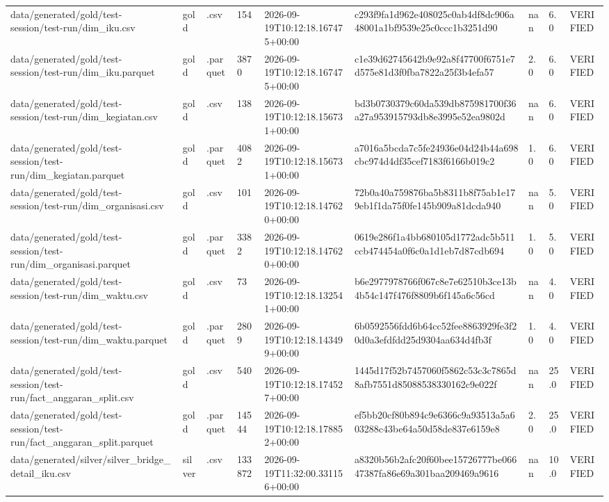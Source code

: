 \begin{longtable}{lllllllll}
data/generated/gold/test-session/test-run/dim_iku.csv & gold & .csv & 154 & 2026-09-19T10:12:18.167475+00:00 & c293f9fa1d962e408025c0ab4df8dc906a48001a1bf9539e25c0ccc1b3251d90 & nan & 6.0 & VERIFIED \\
data/generated/gold/test-session/test-run/dim_iku.parquet & gold & .parquet & 3870 & 2026-09-19T10:12:18.167475+00:00 & c1e39d62745642b9e92a8f47700f6751e7d575e81d3f0fba7822a25f3b4efa57 & 2.0 & 6.0 & VERIFIED \\
data/generated/gold/test-session/test-run/dim_kegiatan.csv & gold & .csv & 138 & 2026-09-19T10:12:18.156731+00:00 & bd3b0730379c60da539db875981700f36a27a953915793db8e3995e52ea9802d & nan & 6.0 & VERIFIED \\
data/generated/gold/test-session/test-run/dim_kegiatan.parquet & gold & .parquet & 4082 & 2026-09-19T10:12:18.156731+00:00 & a7016a5bcda7c5fe24936e04d24b44a698cbc974d4df35cef7183f6166b019c2 & 1.0 & 6.0 & VERIFIED \\
data/generated/gold/test-session/test-run/dim_organisasi.csv & gold & .csv & 101 & 2026-09-19T10:12:18.147620+00:00 & 72b0a40a759876ba5b8311b8f75ab1e179eb1f1da75f0fe145b909a81dcda940 & nan & 5.0 & VERIFIED \\
data/generated/gold/test-session/test-run/dim_organisasi.parquet & gold & .parquet & 3382 & 2026-09-19T10:12:18.147620+00:00 & 0619e286f1a4bb680105d1772adc5b511ccb474454a0f6c0a1d1eb7d87cdb694 & 1.0 & 5.0 & VERIFIED \\
data/generated/gold/test-session/test-run/dim_waktu.csv & gold & .csv & 73 & 2026-09-19T10:12:18.132541+00:00 & b6e2977978766f067c8e7e62510b3ce13b4b54c147f476f8809b6f145a6c56cd & nan & 4.0 & VERIFIED \\
data/generated/gold/test-session/test-run/dim_waktu.parquet & gold & .parquet & 2809 & 2026-09-19T10:12:18.143499+00:00 & 6b0592556fdd6b64cc52fee8863929fe3f20d0a3efdfdd25d9304aa634d4fb3f & 1.0 & 4.0 & VERIFIED \\
data/generated/gold/test-session/test-run/fact_anggaran_split.csv & gold & .csv & 540 & 2026-09-19T10:12:18.174527+00:00 & 1445d17f52b7457060f5862c53c3c7865d8afb7551d85088538330162c9e022f & nan & 25.0 & VERIFIED \\
data/generated/gold/test-session/test-run/fact_anggaran_split.parquet & gold & .parquet & 14544 & 2026-09-19T10:12:18.178852+00:00 & ef5bb20cf80b894c9e6366c9a93513a5a603288c43be64a50d58de837e6159e8 & 2.0 & 25.0 & VERIFIED \\
data/generated/silver/silver_bridge_detail_iku.csv & silver & .csv & 133872 & 2026-09-19T11:32:00.331156+00:00 & a8320b56b2afc20f60bee15726777be06647387fa86e69a301baa209469a9616 & nan & 10.0 & VERIFIED \\

\end{longtable}
